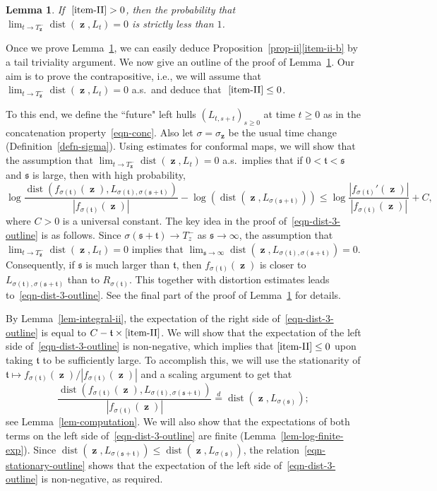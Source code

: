\documentclass[11pt]{article}
\theoremstyle{plain}
\newtheorem{lem}[thm]{Lemma}
\theoremstyle{definition}
\numberwithin{equation}{section}
\newcommand{\eqb}{\begin{equation}}
\newcommand{\eqe}{\end{equation}}
\newcommand{\op}{\operatorname}
\newcommand{\eqD}{\overset{d}{=}}
\newcommand{\rta}{\rightarrow}
\newcommand{\dist}{{\operatorname{dist}}}
\newcommand{\zz}{{\op{\mathbf{z}}}}
\newcommand{\tz}{{\mathfrak t}}
\newcommand{\sz}{{\mathfrak s}}
\begin{document}
\begin{lem} 
If $~\ref{item-II} > 0$, then the probability that $\lim_{t \rta T_{\zz}^-} \dist(\zz,L_t) = 0$ is strictly less than $1$.
\label{lem-converse-w-o-upgrade}
\end{lem}

Once we prove Lemma~\ref{lem-converse-w-o-upgrade}, we can easily deduce Proposition~\hyperref[item-ii-b]{\ref*{prop-ii}\ref*{item-ii-b}} by a tail triviality argument.
We  now give an outline of the proof of Lemma~\ref{lem-converse-w-o-upgrade}. Our aim is to prove the contrapositive, i.e., we will assume that $\lim_{t\rta T_{\zz}^-} \dist(\zz,L_t) = 0$ a.s.\ and deduce that $~\ref{item-II} \leq 0$. 

To this end, we define the ``future" left hulls $(L_{t,s+t})_{s\geq 0}$ at time $t\geq 0$ as in the concatenation property~\eqref{eqn-conc}. 
Also let $\sigma = \sigma_{\zz}$ be the usual time change (Definition~\ref{defn-sigma}). 
Using estimates for conformal maps, we will show that the assumption that $\lim_{t\rta T_{\zz}^-} \dist(\zz,L_t) = 0$ a.s.\ implies that if $0 < \tz < \sz$ and $\sz$ is large, then with high probability,
\eqb
\log \frac{\dist(f_{\sigma(\tz)}(\zz), L_{\sigma(\tz),\sigma(\sz + \tz)})}{|f_{\sigma(\tz)}(\zz)|} - \log(\dist(\zz,L_{\sigma(\sz+\tz)})) \leq \log \frac{|f_{\sigma(\tz)}'(\zz)|}{|f_{\sigma(\tz)}(\zz)|}  + C ,  
\label{eqn-dist-3-outline}
\eqe
where $C>0$ is a universal constant. The key idea in the proof of~\eqref{eqn-dist-3-outline} is as follows. Since $\sigma(\sz+\tz) \rta T_z^-$ as $\sz\rta\infty$, the assumption that $\lim_{t\rta T_{\zz}^-} \dist(\zz,L_t) = 0$ implies that $\lim_{\sz \rta\infty} \dist(\zz,L_{\sigma(\tz),\sigma(\sz+\tz)}) = 0$. Consequently, if $\sz$ is much larger than $\tz$, then $f_{\sigma(\tz)}(\zz)$ is closer to $L_{\sigma(\tz),\sigma(\sz + \tz)}$ than to $R_{\sigma(\tz)}$. This together with distortion estimates leads to~\eqref{eqn-dist-3-outline}. 
See the final part of the proof of Lemma~\ref{lem-converse-w-o-upgrade} for details. 

By Lemma~\ref{lem-integral-ii}, the expectation of the right side of~\eqref{eqn-dist-3-outline} is equal to $C -\tz \times \ref{item-II}$. We will show that the expectation of the left side of~\eqref{eqn-dist-3-outline} is non-negative, which implies that $\ref{item-II} \leq 0$ upon taking $\tz$ to be sufficiently large. To accomplish this, we will use the stationarity of $\tz\mapsto f_{\sigma(\tz)}(\zz) / |f_{\sigma(\tz)}(\zz)|$ and a scaling argument to get that 
\eqb \label{eqn-stationary-outline}
\frac{\dist(f_{\sigma(\tz)}(\zz), L_{\sigma(\tz),\sigma(\sz + \tz)})}{|f_{\sigma(\tz)}(\zz)|} \eqD \dist(\zz,L_{\sigma(\sz )}) ;
\eqe 
see Lemma~\ref{lem-computation}. We will also show that the expectations of both terms on the left side of~\eqref{eqn-dist-3-outline} are finite (Lemma~\ref{lem-log-finite-exp}). 
Since $\op{dist}(\zz , L_{\sigma(\sz + \tz)}) \leq \op{dist}(\zz , L_{\sigma(\sz)})$, the relation~\eqref{eqn-stationary-outline} shows that the expectation of the left side of~\eqref{eqn-dist-3-outline} is non-negative, as required. 
\end{document}
